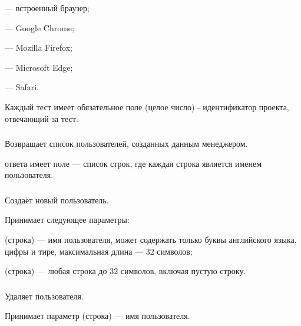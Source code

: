 \begin{icItems}
	\item {} — встроенный браузер;
	\item {} — Google Chrome;
	\item {} — Mozilla Firefox;
	\item {} — Microsoft Edge;
	\item {} — Safari.
\end{icItems}

Каждый тест имеет обязательное поле  (целое число) - идентификатор проекта, отвечающий за тест.

\subsubsection{}

Возвращает список пользователей, созданных данным менеджером.

 ответа имеет поле  — список строк, где каждая строка является именем пользователя.

\subsubsection{}

Создаёт новый пользователь.

Принимает следующее параметры:

\begin{icItems}
	\item {} (строка) — имя пользователя, может содержать только буквы английского языка, цифры и тире, максимальная длина — 32 символов;
	\item {} (строка) — любая строка до 32 символов, включая пустую строку.
\end{icItems}

\subsubsection{}

Удаляет пользователя.

Принимает параметр  (строка) — имя пользователя.

\subsubsection{}

